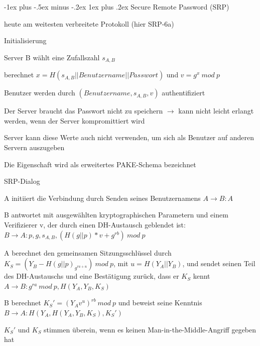 \documentclass[a4paper]{article}
\makeatletter
\renewcommand{\subsubsection}{\@startsection{subsubsection}{3}{0mm}%
 {-1ex plus -.5ex minus -.2ex}%
 {1ex plus .2ex}%
 {\normalfont\small\bfseries}}
\makeatother
\begin{document}
\begin{multicols}{3}
      \subsubsection{Secure Remote Password (SRP)}
      \begin{itemize*}
            \item heute am weitesten verbreitete Protokoll (hier SRP-6a)
            \item Initialisierung
            \begin{itemize*}
                  \item Server B wählt eine Zufallszahl $s_{A,B}$
                  \item berechnet $x=H(s_{A,B} || Benutzername || Passwort)$ und $v=g^x\ mod\ p$
                  \item Benutzer werden durch $(Benutzername, s_{A,B}, v)$ authentifiziert
                  \item Der Server braucht das Passwort nicht zu speichern $\rightarrow$ kann nicht leicht erlangt werden, wenn der Server kompromittiert wird
                  \item Server kann diese Werte auch nicht verwenden, um sich als Benutzer auf anderen Servern auszugeben
                  \item Die Eigenschaft wird als erweitertes PAKE-Schema bezeichnet
            \end{itemize*}
      \end{itemize*}

      SRP-Dialog
      \begin{itemize*}
            \item A initiiert die Verbindung durch Senden seines Benutzernamens $A\rightarrow B: A$
            \item B antwortet mit ausgewählten kryptographischen Parametern und einem Verifizierer v, der durch einen DH-Austausch geblendet ist: $B\rightarrow A: p, g, s_{A,B}, (H(g || p)*v + g^{rb})\ mod\ p$
            \item A berechnet den gemeinsamen Sitzungsschlüssel durch $K_S=(Y_B-H(g || p)_{g^{ra+u}})\ mod\ p$, mit $u=H(Y_A||Y_B)$, und sendet seinen Teil des DH-Austauschs und eine Bestätigung zurück, dass er $K_S$ kennt $A\rightarrow B:g^{ra}\ mod\ p, H(Y_A,Y_B,K_S)$
            \item B berechnet $K_S'=(Y_A v^u)^{rb}\ mod\ p$ und beweist seine Kenntnis $B\rightarrow A:H(Y_A, H(Y_A,Y_B,K_S),K_S')$
            \item $K_S'$ und $K_S$ stimmen überein, wenn es keinen Man-in-the-Middle-Angriff gegeben hat
      \end{itemize*}


\end{multicols}
\end{document}
